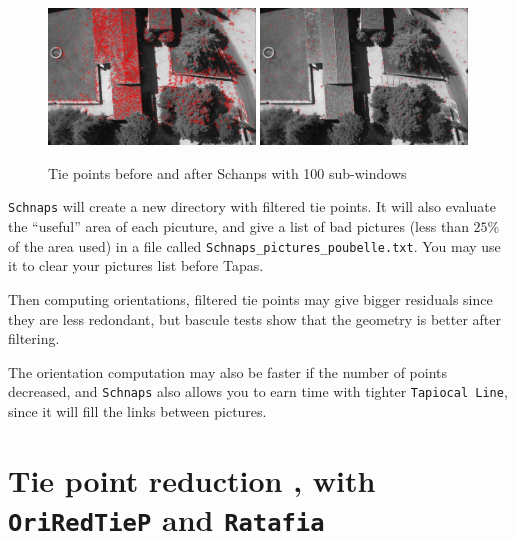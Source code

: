 \begin{figure}
\begin{center}
\includegraphics[width=0.49\textwidth]{FIGS/Schnaps/Schnaps_homol_all.jpg}
\includegraphics[width=0.49\textwidth]{FIGS/Schnaps/Schnaps_homol_100.jpg}
\end{center}
\caption{Tie points before and after Schanps with 100 sub-windows}
\end{figure}

{\tt Schnaps} will create a new directory with filtered tie points.
It will also evaluate the ``useful'' area of each picuture, and give a list of bad pictures (less than $25\%$ of the area used) in a file called {\tt Schnaps\_pictures\_poubelle.txt}. You may use it to clear your pictures list before Tapas.

Then computing orientations, filtered tie points may give bigger residuals since they are less redondant, but bascule tests show that the geometry is better
after filtering.

The orientation computation may also be faster if the number of points decreased, and {\tt Schnaps} also allows you to earn time with tighter {\tt Tapiocal Line},
since it will fill the links between pictures.


\section{Tie point reduction , with {\tt OriRedTieP} and {\tt Ratafia}}

